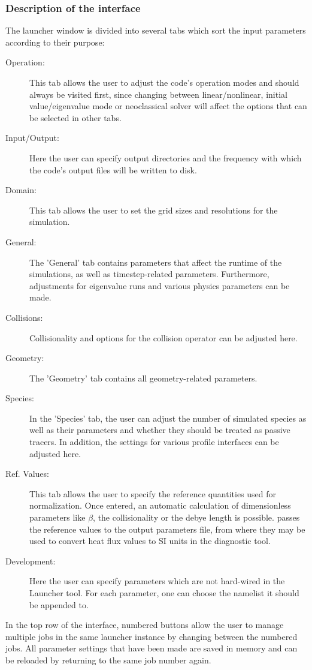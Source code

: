 \documentclass[12pt]{article}
\begin{document}
\subsubsection{Description of the interface}
The launcher window is divided into several tabs which sort the input parameters according to their purpose:
\begin{description}
\item[Operation:] This tab allows the user to adjust the \gene code's operation modes and
 should always be visited first, since changing between linear/nonlinear, initial value/eigenvalue mode or
 neoclassical solver will affect the options that can be selected in other tabs.
\item[Input/Output:] Here the user can specify output directories and the frequency with
  which the code's output files will be written to disk.
\item[Domain:] This tab allows the user to set the grid sizes and resolutions for the simulation.
\item[General:] The 'General' tab contains parameters that affect the runtime of the
  simulations, as well as timestep-related parameters. Furthermore, adjustments for eigenvalue
  runs and various physics parameters can be made.
\item[Collisions:] Collisionality and options for the collision operator can be adjusted here.
\item[Geometry:] The 'Geometry' tab contains all geometry-related parameters.
\item[Species:] In the 'Species' tab, the user can adjust the number of simulated species as
  well as their parameters and whether they should be treated as passive tracers. In addition,
  the settings for various profile interfaces can be adjusted here.
\item[Ref. Values:] This tab allows the user to specify the reference quantities used for
  normalization. Once entered, an automatic calculation of dimensionless parameters like
  $\beta$, the collisionality or the debye length is possible. \gene passes
  the reference values to the output parameters file, from where they may be used to convert
  heat flux values to SI units in the diagnostic tool.
\item[Development:] Here the user can specify parameters which are not hard-wired in the Launcher
  tool. For each parameter, one can choose the namelist it should be appended to.
\end{description}

In the top row of the interface, numbered buttons allow the user to manage multiple jobs in
the same launcher instance by changing between the numbered jobs. All parameter settings that
have been made are saved in memory and can be reloaded by returning to the same job number again.
\end{document}

